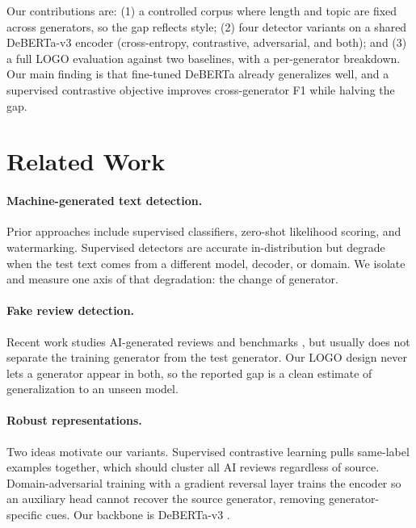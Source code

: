 \documentclass[manuscript,nonacm]{acmart}
\begin{document}
Our contributions are: (1) a controlled corpus where length and topic are fixed
across generators, so the gap reflects style; (2) four detector variants on a
shared DeBERTa-v3 encoder (cross-entropy, contrastive, adversarial, and both);
and (3) a full LOGO evaluation against two baselines, with a per-generator
breakdown. Our main finding is that fine-tuned DeBERTa already generalizes well,
and a supervised contrastive objective improves cross-generator F1 while halving
the gap.

\section{Related Work}

\paragraph{Machine-generated text detection.}
Prior approaches include supervised classifiers, zero-shot likelihood scoring,
and watermarking. Supervised detectors are accurate in-distribution but degrade
when the test text comes from a different model, decoder, or domain. We isolate
and measure one axis of that degradation: the change of generator.

\paragraph{Fake review detection.}
Recent work studies AI-generated reviews and benchmarks
\cite{bag2025,guo2024,kashifpour2025}, but usually does not separate the training
generator from the test generator. Our LOGO design never lets a generator appear
in both, so the reported gap is a clean estimate of generalization to an unseen
model.

\paragraph{Robust representations.}
Two ideas motivate our variants. Supervised contrastive learning
\cite{khosla2020supcon} pulls same-label examples together, which should cluster
all AI reviews regardless of source. Domain-adversarial training with a gradient
reversal layer \cite{ganin2015dann} trains the encoder so an auxiliary head
cannot recover the source generator, removing generator-specific cues. Our
backbone is DeBERTa-v3 \cite{he2021deberta}.
\end{document}
